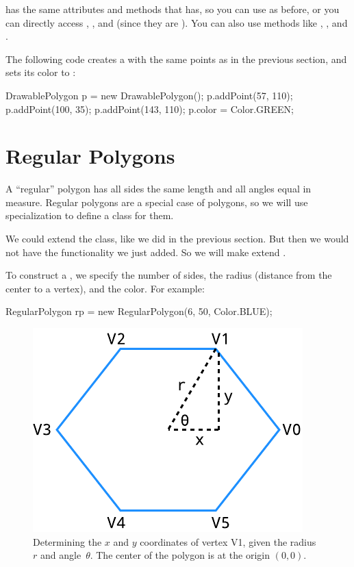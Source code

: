  has the same attributes and methods that  has, so you can use  as before, or you can directly access , , and  (since they are ).
You can also use methods like , , and .

The following code creates a  with the same points as in the previous section, and sets its color to :

\begin{code}
DrawablePolygon p = new DrawablePolygon();
p.addPoint(57, 110);
p.addPoint(100, 35);
p.addPoint(143, 110);
p.color = Color.GREEN;
\end{code}


\section{Regular Polygons}

A ``regular'' polygon has all sides the same length and all angles equal in measure.
Regular polygons are a special case of polygons, so we will use specialization to define a class for them.

We could extend the  class, like we did in the previous section.
But then we would not have the  functionality we just added.
So we will make  extend .

To construct a , we specify the number of sides, the radius (distance from the center to a vertex), and the color.
For example:

\begin{code}
RegularPolygon rp = new RegularPolygon(6, 50, Color.BLUE);
\end{code}

\begin{figure}[!ht]
\begin{center}
\includegraphics{figs/hexagon.pdf}
\caption{Determining the $x$ and $y$ coordinates of vertex V1, given the radius~$r$ and angle~$\theta$. The center of the polygon is at the origin $(0, 0)$.}
\label{fig:hexagon}
\end{center}
\end{figure}

